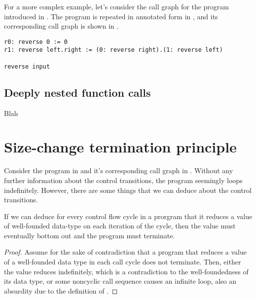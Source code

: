  

For a more complex example, let's consider the call graph for the program
 introduced in . The program is
repeated in annotated form in , and its
corresponding call graph is shown in .

\begin{lstlisting}[label=listing:cfg-reverse,caption={An annotated version of the program \mono{reverse} introduced in \referToSection{d-samples}.}]
r0: reverse 0 := 0
r1: reverse left.right := (0: reverse right).(1: reverse left)

reverse input
\end{lstlisting}

 

\subsection{Deeply nested function calls}

Blah

\section{Size-change termination principle}

Consider the program in  and it's corresponding call
graph in . Without any further information about the
control transitions, the program seemingly loops indefinitely. However, there
are some things that we can deduce about the control transitions.

\begin{lemma} If we can deduce for every control flow cycle in a prorgram that
it reduces a value of well-founded data-type on each iteration of the cycle,
then the value must eventually bottom out and the program must terminate.
\end{lemma}

\begin{proof} Assume for the sake of contradiction that a program that reduces
a value of a well-founded data type in each call cycle does not terminate.
Then, either the value reduces indefinitely, which is a contradiction to the
well-foundedness of its data type, or some noncyclic call sequence causes an
infinite loop, also an absurdity due to the definition of \D{}. \end{proof}

